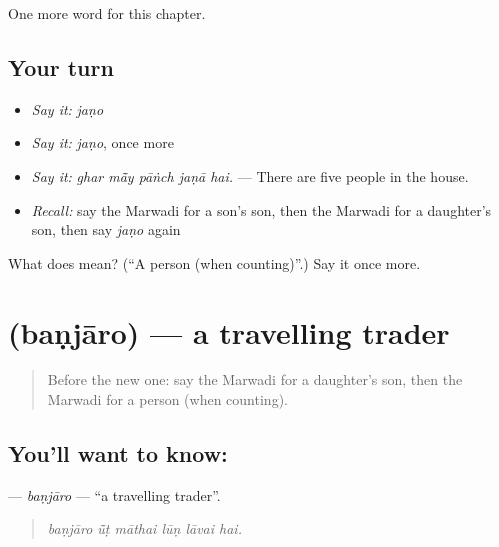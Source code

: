 \begin{grammarlens}[title={What you've built}]
One more word for this chapter.
\end{grammarlens}

\subsection*{Your turn}
\begin{itemize}
\raggedright
  \item \emph{Say it:} \emph{jaṇo}
  \item \emph{Say it:} \emph{jaṇo}, once more
  \item \emph{Say it:} \emph{ghar mā̃y pāṅch jaṇā hai.} — There are five people in the house.
  \item \emph{Recall:} say the Marwadi for a son's son, then the Marwadi for a daughter's son, then say \emph{jaṇo} again
\end{itemize}

\begin{tcolorbox}[breakable,colback=teal!4,colframe=teal!35!black,title={Before you move on}]
What does  mean? (\textquotedblleft{}A person (when counting)\textquotedblright{}.) Say it once more.
\end{tcolorbox}
\section[\texorpdfstring{\mw{बणजारो} (baṇjāro)}{बणजारो (baṇjāro)}]{ (baṇjāro) — a travelling trader}

\label{lesson:MW-C262-banjaro}



\begin{quote}
Before the new one: say the Marwadi for a daughter's son, then the Marwadi for a person (when counting).
\end{quote}

\subsection*{You'll want to know: }
\textbf{} — \emph{baṇjāro} — \textquotedblleft{}a travelling trader\textquotedblright{}.

\begin{quote}
     
\end{quote}

\begin{quote}
\emph{baṇjāro ū̃ṭ māthai lūṇ lāvai hai.}
\end{quote}


